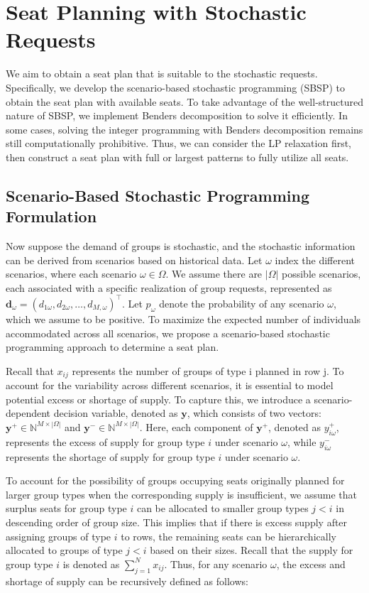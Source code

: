 
\section{Seat Planning with Stochastic Requests}\label{sec_seat_planning}
We aim to obtain a seat plan that is suitable to the stochastic requests. Specifically, we develop the scenario-based stochastic programming (SBSP) to obtain the seat plan with available seats. To take advantage of the well-structured nature of SBSP, we implement Benders decomposition to solve it efficiently. In some cases, solving the integer programming with Benders decomposition remains still computationally prohibitive. Thus, we can consider the LP relaxation first, then construct a seat plan with full or largest patterns to fully utilize all seats.

\subsection{Scenario-Based Stochastic Programming Formulation}
Now suppose the demand of groups is stochastic, and the stochastic information can be derived from scenarios based on historical data. Let $\omega$ index the different scenarios, where each scenario $\omega \in \Omega$. We assume there are $|\Omega|$ possible scenarios, each associated with a specific realization of group requests, represented as $\mathbf{d}_\omega = (d_{1\omega},d_{2\omega},\ldots,d_{M,\omega})^{\intercal}$. Let $p_{\omega}$ denote the probability of any scenario $\omega$, which we assume to be positive. To maximize the expected number of individuals accommodated across all scenarios, we propose a scenario-based stochastic programming approach to determine a seat plan.

Recall that $x_{ij}$ represents the number of groups of type i planned in row j. To account for the variability across different scenarios, it is essential to model potential excess or shortage of supply. To capture this, we introduce a scenario-dependent decision variable, denoted as $\mathbf{y}$, which consists of two vectors: $\mathbf{y}^{+} \in \mathbb{N}^{M \times |\Omega|}$ and $\mathbf{y}^{-} \in \mathbb{N}^{M \times |\Omega|}$. Here, each component of $\mathbf{y}^{+}$, denoted as $y_{i\omega}^{+}$, represents the excess of supply for group type $i$ under scenario $\omega$, while $y_{i\omega}^{-}$ represents the shortage of supply for group type $i$ under scenario $\omega$.

To account for the possibility of groups occupying seats originally planned for larger group types when the corresponding supply is insufficient, we assume that surplus seats for group type $i$ can be 
allocated to smaller group types $j<i$ in descending order of group size. This implies that if there is excess supply after assigning groups of type $i$ to rows, the remaining seats can be hierarchically allocated to groups of type $j<i$ based on their sizes. Recall that the supply for group type $i$ is denoted as $\sum_{j=1}^N x_{ij}$. Thus, for any scenario $\omega$, the excess and shortage of supply can be recursively defined as follows:


